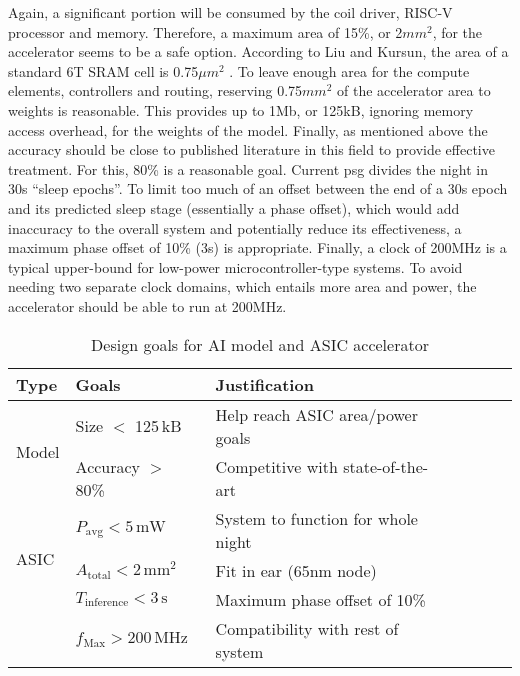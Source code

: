 \documentclass[12pt]{article}
\begin{document}
Again, a significant portion will be consumed by the coil driver, RISC-V processor and memory. Therefore, a maximum area of 15\%, or 2$mm^2$, for the accelerator seems to be a safe
option. According to Liu and Kursun, the area of a standard 6T SRAM cell is 0.75$\mu m^2$ \cite*{liu2008characterization}. To leave enough area for the compute elements, controllers
and routing, reserving 0.75$mm^2$ of the accelerator area to weights is reasonable. This provides up to 1Mb, or 125kB, ignoring memory access overhead, for the weights of the model.
Finally, as mentioned above the accuracy should be close to published literature in this field to provide effective treatment. For this, 80\% is a reasonable goal. Current \ac{psg}
divides the night in 30s ``sleep epochs''. To limit too much of an offset between the end of a 30s epoch and its predicted sleep stage (essentially a phase offset), which would add
inaccuracy to the overall system and potentially reduce its effectiveness, a maximum phase offset of 10\% (3s) is appropriate. Finally, a clock of 200MHz is a typical upper-bound
for low-power microcontroller-type systems. To avoid needing two separate clock domains, which entails more area and power, the accelerator should be able to run at 200MHz.

\begin{table}
    \centering
    \renewcommand{\arraystretch}{1.2} %
    \setlength{\arrayrulewidth}{1.5pt} %
    \caption{Design goals for AI model and ASIC accelerator}
    \begin{tabular}{@{} *7l @{}}
        \toprule
        Type        & Goals                                     & Justification &&&  \\\midrule
        \multirow{2}{*}{Model}
                    & Size $<$ 125\,kB                          & Help reach ASIC area/power goals \\
                    & Accuracy $>$ 80\%                         & Competitive with state-of-the-art \\ \bottomrule
        \multirow{3}{*}{ASIC}
                    & $P_{\mathrm{avg}} < 5\,\mathrm{mW}$       & System to function for whole night \\
                    & $A_{\mathrm{total}} < 2\,\mathrm{mm}^2$   & Fit in ear (65nm node) \\
                    & $T_{\mathrm{inference}} < 3\,\mathrm{s}$  & Maximum phase offset of 10\% \\
                    & $f_{\mathrm{Max}} > 200\,\mathrm{MHz}$    & Compatibility with rest of system \\
        \hline
    \end{tabular}
    \label{tab:design_goals}
\end{table}
\end{document}
